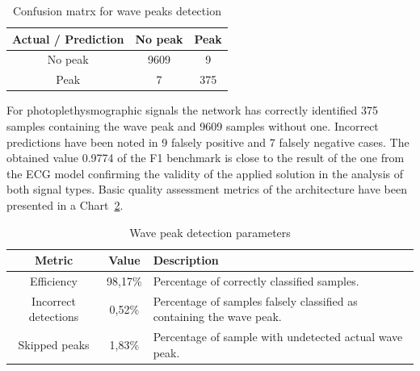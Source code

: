 \documentclass[journal]{IEEEtran}
\begin{document}
{%
\begin{table}[ht]
\centering
\caption{Confusion matrx for wave peaks detection}
\label{tab:conf_matrix_ppg}
\begin{tabular}{|c|c|c|}
\hline
\textbf{Actual / Prediction} & \textbf{No peak } & \textbf{Peak} \\
\hline
No peak  & 9609 & 9 \\

Peak  & 7 & 375 \\
\hline
\end{tabular}
\end{table}

For photoplethysmographic signals the network has correctly identified 375 samples containing the wave peak and 9609 samples without one. Incorrect predictions have been noted in 9 falsely positive and 7 falsely negative cases. The obtained value 0.9774 of the F1 benchmark is close to the result of the one from the ECG model confirming the validity of the applied solution in the analysis of both signal types.
Basic quality assessment metrics of the architecture have been presented in a Chart~\ref{tab:metrics_ppg}.

\begin{table}[ht]
\centering
\caption{Wave peak detection parameters}
\label{tab:metrics_ppg}
\begin{tabular}{|c|c|p{4.6cm}|}
\hline
\textbf{Metric} & \textbf{Value} & \textbf{Description} \\
\hline
Efficiency & 98,17\% & Percentage of correctly classified samples. \\
Incorrect detections & 0,52\% & Percentage of samples falsely classified as containing the wave peak. \\
Skipped peaks & 1,83\% & Percentage of sample with undetected actual wave peak. \\
\hline
\end{tabular}
\end{table}

}
\end{document}
